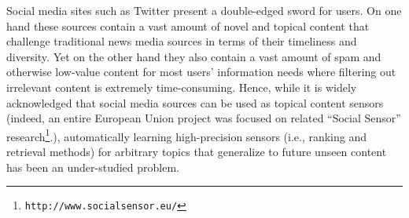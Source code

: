

\label{sec:introduction}
Social media sites such as Twitter present a double-edged sword for
users.  On one hand these sources contain a vast amount of novel and
topical content that challenge traditional news media sources in terms
of their timeliness and diversity.  Yet on the other hand they also
contain a vast amount of spam and otherwise low-value content for most
users' information needs where filtering out irrelevant content is
extremely time-consuming.  Hence, while it is widely acknowledged that
social media sources can be used as topical content sensors (indeed,
an entire European Union project was focused on related ``Social Sensor''
research\footnote{\texttt{http://www.socialsensor.eu/}}.),
automatically learning high-precision sensors (i.e., ranking and
retrieval methods) for arbitrary topics that generalize to future
unseen content has been an under-studied problem.   


